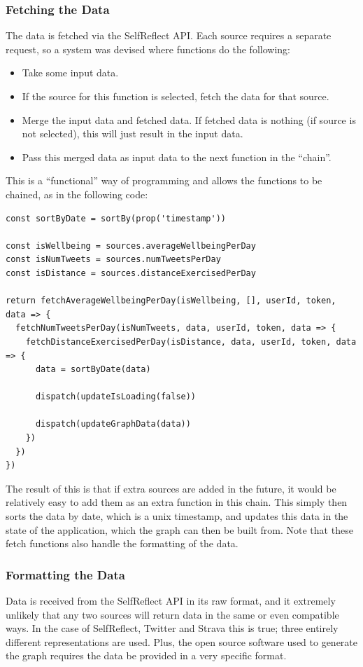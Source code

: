 \documentclass[11pt,openright,a4paper]{report}
\begin{document}
\subsubsection{Fetching the Data}
The data is fetched via the SelfReflect API. Each source requires a separate request, so a system was devised where functions do the following:
\begin{itemize}
\item Take some input data.
\item If the source for this function is selected, fetch the data for that source.
\item Merge the input data and fetched data. If fetched data is nothing (if source is not selected), this will just result in the input data.
\item Pass this merged data as input data to the next function in the \enquote{chain}.
\end{itemize}
This is a \enquote{functional} way of programming and allows the functions to be chained, as in the following code:
\begin{lstlisting}
const sortByDate = sortBy(prop('timestamp'))

const isWellbeing = sources.averageWellbeingPerDay
const isNumTweets = sources.numTweetsPerDay
const isDistance = sources.distanceExercisedPerDay

return fetchAverageWellbeingPerDay(isWellbeing, [], userId, token, data => {
  fetchNumTweetsPerDay(isNumTweets, data, userId, token, data => {
    fetchDistanceExercisedPerDay(isDistance, data, userId, token, data => {
      data = sortByDate(data)

      dispatch(updateIsLoading(false))

      dispatch(updateGraphData(data))
    })
  })
})
\end{lstlisting}

The result of this is that if extra sources are added in the future, it would be relatively easy to add them as an extra function in this chain. This simply then sorts the data by date, which is a unix timestamp, and updates this data in the state of the application, which the graph can then be built from. Note that these fetch functions also handle the formatting of the data.

\subsubsection{Formatting the Data}
Data is received from the SelfReflect API in its raw format, and it extremely unlikely that any two sources will return data in the same or even compatible ways. In the case of SelfReflect, Twitter and Strava this is true; three entirely different representations are used. Plus, the open source software used to generate the graph requires the data be provided in a very specific format.
\end{document}
